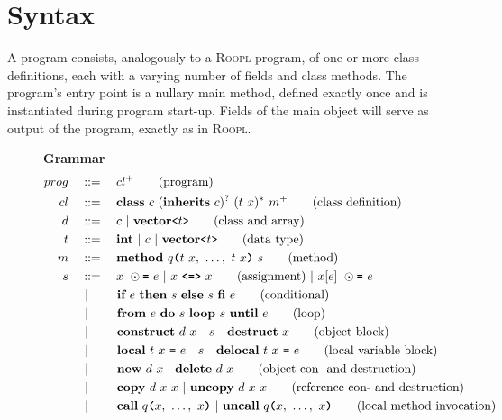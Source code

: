 \section{Syntax}
\label{sec:syntax}
A \rooplpp program consists, analogously to a \textsc{Roopl} program, of one or more class definitions, each with a varying number of fields and class methods. The program's entry point is a nullary main method, defined exactly once and is instantiated during program start-up. Fields of the main object will serve as output of the program, exactly as in \textsc{Roopl}.
\begin{figure}[h]
\centering
\vspace{3mm}
\textbf{\rooplpp Grammar}
\begin{align}
    prog		\quad&::= \quad cl^+ \tag{program}\\
    cl			\quad&::=\quad \textbf{class}\ c\ (\textbf{inherits}\ c)^?\ (t\ x)^*\ m^+\tag{class definition}\\
    d           \quad&::=\quad c\ |\ \textbf{vector}\texttt{<}t\texttt{>} \tag{class and array}\\
    t			\quad&::=\quad \textbf{int}\ |\ c\ |\ \textbf{vector}\texttt{<}t\texttt{>} \tag{data type}\\
    m			\quad&::=\quad \textbf{method}\ q\textbf{\texttt{(}}t\ x,\ \dots,\ t\ x\textbf{\texttt{)}}\ s\tag{method}\\
    s			\quad&::=\quad x\ \odot\textbf{\texttt{=}}\ e\ |\ x\ \textbf{\texttt{<=>}}\ x\tag{assignment}\ |\ x[e]\ \odot\textbf{\texttt{=}}\ e\\\
    			&\ |\ \qquad \textbf{if}\ e\ \textbf{then}\ s\ \textbf{else}\ s\ \textbf{fi}\ e\tag{conditional}\\
    			&\ |\ \qquad \textbf{from}\ e\ \textbf{do}\ s\ \textbf{loop}\ s\ \textbf{until}\ e\tag{loop}\\
                &\ |\ \qquad \textbf{construct}\ d\ x\quad s\quad\textbf{destruct}\ x\tag{object block}\\
                &\ |\ \qquad \textbf{local}\ t\ x\ \texttt{=}\ e\quad s\quad\textbf{delocal}\ t\ x\ \texttt{=}\ e\tag{local variable block}\\
                &\ |\ \qquad \textbf{new}\ d\ x\ |\ \textbf{delete}\ d\ x \tag{object con- and destruction}\\
                &\ |\ \qquad \textbf{copy}\ d\ x\ x\ |\ \textbf{uncopy}\ d\ x\ x \tag{reference con- and destruction}\\
    			&\ |\ \qquad \textbf{call}\ q\textbf{\texttt{(}}x,\ \dots,\ x\textbf{\texttt{)}}\ |\ \textbf{uncall}\ q\textbf{\texttt{(}}x,\ \dots,\ x\textbf{\texttt{)}}\tag{local method invocation}\\

\end{align}
\end{figure}
